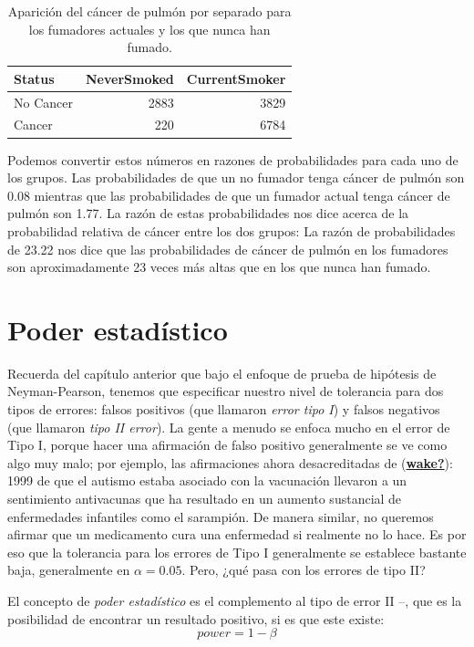 \documentclass[
  12pt,
]{book}
\theoremstyle{definition}
\theoremstyle{definition}
\theoremstyle{definition}
\theoremstyle{remark}
\begin{document}
\begin{table}

\caption{\label{tab:unnamed-chunk-52}Aparición del cáncer de pulmón por separado para los fumadores actuales y los que nunca han fumado.}
\centering
\begin{tabular}[t]{l|r|r}
\hline
Status & NeverSmoked & CurrentSmoker\\
\hline
No Cancer & 2883 & 3829\\
\hline
Cancer & 220 & 6784\\
\hline
\end{tabular}
\end{table}

Podemos convertir estos números en razones de probabilidades para cada uno de los grupos. Las probabilidades de que un no fumador tenga cáncer de pulmón son 0.08 mientras que las probabilidades de que un fumador actual tenga cáncer de pulmón son 1.77. La razón de estas probabilidades nos dice acerca de la probabilidad relativa de cáncer entre los dos grupos: La razón de probabilidades de 23.22 nos dice que las probabilidades de cáncer de pulmón en los fumadores son aproximadamente 23 veces más altas que en los que nunca han fumado.

\hypertarget{statistical-power}{%
\section{Poder estadístico}\label{statistical-power}}

Recuerda del capítulo anterior que bajo el enfoque de prueba de hipótesis de Neyman-Pearson, tenemos que especificar nuestro nivel de tolerancia para dos tipos de errores: falsos positivos (que llamaron \emph{error tipo I}) y falsos negativos (que llamaron \emph{tipo II error}). La gente a menudo se enfoca mucho en el error de Tipo I, porque hacer una afirmación de falso positivo generalmente se ve como algo muy malo; por ejemplo, las afirmaciones ahora desacreditadas de (\protect\hyperlink{ref-wake}{\textbf{wake?}}): 1999 de que el autismo estaba asociado con la vacunación llevaron a un sentimiento antivacunas que ha resultado en un aumento sustancial de enfermedades infantiles como el sarampión. De manera similar, no queremos afirmar que un medicamento cura una enfermedad si realmente no lo hace. Es por eso que la tolerancia para los errores de Tipo I generalmente se establece bastante baja, generalmente en \(\alpha = 0.05\). Pero, ¿qué pasa con los errores de tipo II?

El concepto de \emph{poder estadístico} es el complemento al tipo de error II --, que es la posibilidad de encontrar un resultado positivo, si es que este existe:
\[ 
power = 1 - \beta
\]
\end{document}
